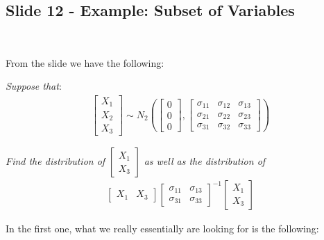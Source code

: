\subsection{Slide 12 - Example: Subset of Variables}\hfill\\
\par\bigskip
\noindent From the slide we have the following:\par
\textit{Suppose that}:
\begin{equation*}
  \begin{gathered}
    \begin{bmatrix}X_1\\X_2\\X_3\end{bmatrix}\sim N_2\left(\begin{bmatrix}0\\0\\0\end{bmatrix}, 
    \begin{bmatrix}
      \sigma_{11}&\sigma_{12}&\sigma_{13}\\
      \sigma_{21}&\sigma_{22}&\sigma_{23}\\
      \sigma_{31}&\sigma_{32}&\sigma_{33}
  \end{bmatrix}\right)
  \end{gathered}
\end{equation*}\par
\textit{Find the distribution of } $\begin{bmatrix}X_1\\X_3\end{bmatrix}$ \textit{as well as the distribution of }
\begin{equation*}
  \begin{gathered}
    \begin{bmatrix}X_1&X_3\end{bmatrix}\begin{bmatrix}\sigma_{11}&\sigma_{13}\\\sigma_{31}&\sigma_{33}\end{bmatrix}^{-1}\begin{bmatrix}X_1\\X_3\end{bmatrix}
  \end{gathered}
\end{equation*}
\par\bigskip
\noindent In the first one, what we really essentially are looking for is the following:
